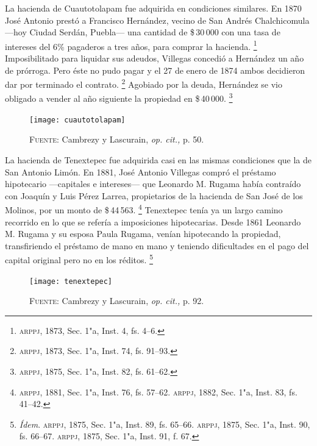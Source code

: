 \documentclass[14pt,twoside,final]{extbook} %
\let\oldfootnote\footnote
\renewcommand\footnote[1]{%
\oldfootnote{\hspace{1mm}#1}}
\begin{document}
La hacienda de Cuautotolapam fue adquirida en condiciones similares. En 1870 José Antonio prestó a Francisco Hernández, vecino de San Andrés Chalchicomula ---hoy Ciudad Serdán, Puebla--- una cantidad de \$\,30\,000 con una tasa de intereses del 6\% pagaderos a tres años, para comprar la hacienda.\footnote{\textsc{arppj}, 1873, Sec. 1"a, Inst. 4, fs. 4--6.} Imposibilitado para liquidar sus adeudos, Villegas concedió a Hernández un año de prórroga. Pero éste no pudo pagar y el 27 de enero de 1874 ambos decidieron dar por terminado el contrato.\footnote{\textsc{arppj}, 1873, Sec. 1"a, Inst. 74, fs. 91--93.} Agobiado por la deuda, Hernández se vio obligado a vender al año siguiente la propiedad en \$\,40\,000.\footnote{\textsc{arppj}, 1875, Sec. 1"a, Inst. 82, fs. 61--62.}
\begin{figure}
\centering
\texttt{[image: cuautotolapam]}
\caption[Plano de la hacienda de Cuautotolapam]{\textsc{Fuente:} Cambrezy y Lascurain, \emph{op. cit.,} p. 50.}
\label{fig:hda-cuatotolapam}
\end{figure}

La hacienda de Tenextepec fue adquirida casi en las mismas condiciones que la de San Antonio Limón. En 1881, José Antonio Villegas compró el préstamo hipotecario ---capitales e intereses--- que Leonardo M. Rugama había contraído con Joaquín y Luis Pérez Larrea, propietarios de la hacienda de San José de los Molinos, por un monto de \$\,44\,563.\footnote{\textsc{arppj}, 1881, Sec. 1"a, Inst. 76, fs. 57--62. \textsc{arppj}, 1882, Sec. 1"a, Inst. 83, fs. 41--42.} Tenextepec tenía ya un largo camino recorrido en lo que se refería a imposiciones hipotecarias. Desde 1861 Leonardo M. Rugama y su esposa Paula Rugama, venían hipotecando la propiedad, transfiriendo el préstamo de mano en mano y teniendo dificultades en el pago del capital original pero no en los réditos.\footnote{\emph{Ídem}. \textsc{arppj}, 1875, Sec. 1"a, Inst. 89, fs. 65--66. \textsc{arppj}, 1875, Sec. 1"a, Inst. 90, fs. 66--67. \textsc{arppj}, 1875, Sec. 1"a, Inst. 91, f. 67.}
\begin{figure}
\centering
\texttt{[image: tenextepec]}
\caption[Plano de la hacienda de Tenextepec]{\textsc{Fuente:} Cambrezy y Lascurain, \emph{op. cit.,} p. 92.}
\label{fig:hda-tenextepec}
\end{figure}
\end{document}
